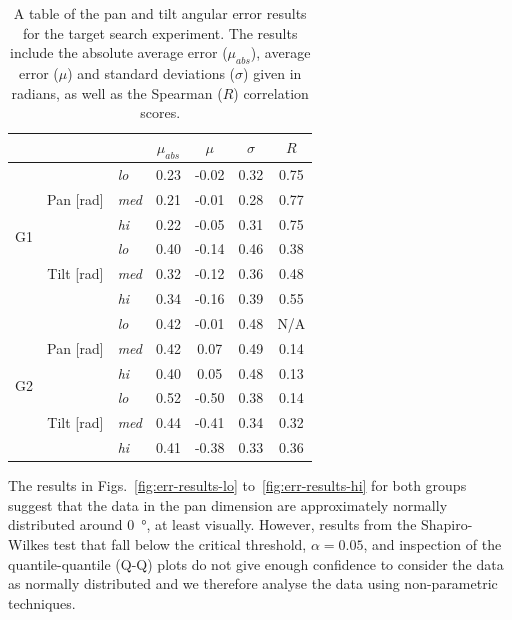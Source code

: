 \documentclass[sigconf, review=true, screen=true, anonymous=true]{acmart}
\begin{document}
\begin{table}
  \centering
  \caption{A table of the pan and tilt angular error results for the target search experiment. The results include the absolute average error ($\mu_{abs}$), average error ($\mu$) and standard deviations ($\sigma$) given in radians, as well as the Spearman ($R$) correlation scores.}
  \label{tab:results}
  \begin{tabular}{cclcccc}
    \toprule
    \multicolumn{3}{c}{} & $\mu_{abs}$ & $\mu$ & $\sigma$ & $R$ \\\midrule
    \multirow{6}{*}{G1}  & & \emph{lo}  & 0.23 & -0.02 & 0.32 & 0.75 \\
	 & Pan [rad] & \emph{med} & 0.21 & -0.01 & 0.28 & 0.77 \\
	 & & \emph{hi}  & 0.22 & -0.05 & 0.31 & 0.75 \\\cmidrule{3-7}
	 & & \emph{lo}  & 0.40 & -0.14 & 0.46 & 0.38 \\
	 & Tilt [rad] & \emph{med} & 0.32 & -0.12 & 0.36 & 0.48 \\
	 & & \emph{hi}  & 0.34 & -0.16 & 0.39 & 0.55 \\\midrule
    \multirow{6}{*}{G2} & & \emph{lo}  & 0.42 & -0.01 & 0.48 & N/A \\
	 & Pan [rad] & \emph{med} & 0.42 & 0.07 & 0.49 & 0.14 \\
	 & & \emph{hi}  & 0.40 & 0.05 & 0.48 & 0.13 \\\cmidrule{3-7}
	 & & \emph{lo}  & 0.52 & -0.50 & 0.38 & 0.14 \\
	 & Tilt [rad] & \emph{med} & 0.44 & -0.41 & 0.34 & 0.32 \\
	 & & \emph{hi}  & 0.41 & -0.38 & 0.33 & 0.36 \\
    \bottomrule
  \end{tabular}
\end{table}

The results in Figs.~\ref{fig:err-results-lo} to~\ref{fig:err-results-hi} for both groups suggest that the data in the pan dimension are approximately normally distributed around \SI{0}{\degree}, at least visually.
However, results from the Shapiro-Wilkes test that fall below the critical threshold, $\alpha=0.05$, and inspection of the quantile-quantile (Q-Q) plots do not give enough confidence to consider the data as normally distributed and we therefore analyse the data using non-parametric techniques. 

\end{document}
